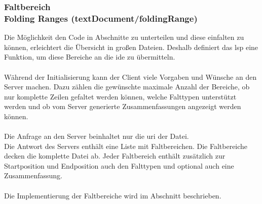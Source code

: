 \documentclass[./einleitung.tex]{subfiles}
\begin{document}
    \subsubsection[Faltbereich]{Faltbereich\\ {\textnormal{\footnotesize Folding Ranges (textDocument/foldingRange) \cite{folding}}}}\label{subsubsec:folding}
    Die Möglichkeit den Code in Abschnitte zu unterteilen und diese einfalten zu können, erleichtert die Übersicht in großen Dateien.
    Deshalb definiert das \acrshort{lsp} eine Funktion, um diese Bereiche an die \acrshort{ide} zu übermitteln.
    \\\\
    Während der Initialisierung kann der Client viele Vorgaben und Wünsche an den Server machen.
    Dazu zählen die gewünschte maximale Anzahl der Bereiche,
    ob nur komplette Zeilen gefaltet werden können,
    welche Falttypen unterstützt werden und ob vom Server generierte Zusammenfassungen angezeigt werden können.
    \\\\
    Die Anfrage an den Server beinhaltet nur die \acrshort{uri} der Datei.\\
    Die Antwort des Servers enthält eine Liste mit Faltbereichen.
    Die Faltbereiche decken die komplette Datei ab.
    Jeder Faltbereich enthält zusätzlich zur Startposition und Endposition auch den Falttypen und optional auch eine Zusammenfassung.
    \\\\
    Die Implementierung der Faltbereiche wird im Abschnitt  beschrieben.
\end{document}
